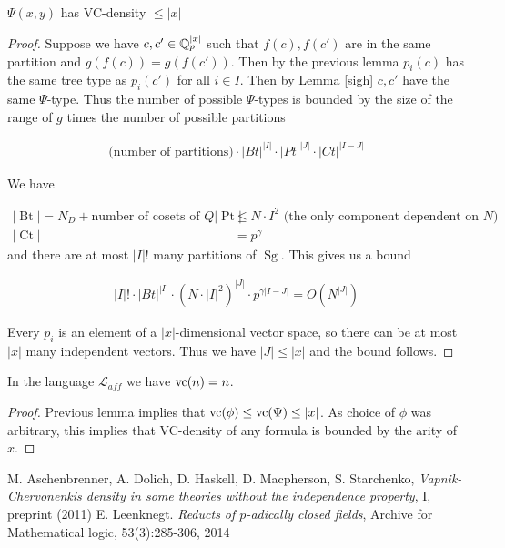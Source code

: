 \documentclass{amsart}
\newcommand{\LLA}{\mathcal L_{aff}}
\DeclareMathOperator{\Sg}{Sg}
\DeclareMathOperator{\Bt}{Bt}
\DeclareMathOperator{\Pt}{Pt}
\DeclareMathOperator{\Ct}{Ct}
\begin{document}
\begin{Corollary}
  $\Psi(x,y)$ has VC-density $\leq |x|$
\end{Corollary}

\begin{proof}
  Suppose we have $c, c' \in \mathbb{Q}_p^{|x|}$ such that $f(c), f(c')$ are in the same partition and $g(f(c)) = g(f(c'))$.
  Then by the previous lemma $p_i(c)$ has the same tree type as $p_i(c')$ for all $i\in I$.
  Then by Lemma \ref{sigh} $c, c'$ have the same $\Psi$-type.
  Thus the number of possible $\Psi$-types is bounded by the size of the range of $g$ times the number of possible partitions
  
  \begin{align*}
    \text{(number of partitions)} \cdot |Bt|^{|I|} \cdot |Pt|^{|J|} \cdot |Ct|^{|I-J|}
  \end{align*}
  
  We have
  
  \begin{align*}
    |\Bt| = N_D + \text {number of cosets of $Q$}
    |\Pt| &\leq N \cdot I^2 \text { (the only component dependent on $N$)} \\
    |\Ct| &= p^\gamma 
  \end{align*}
  and there are at most ${|I|}!$ many partitions of $\Sg$. 
  This gives us a bound
  
  \begin{align*}
    {|I|}! \cdot |Bt|^{|I|} \cdot (N \cdot {|I|}^2)^{|J|} \cdot p^{\gamma {|I-J|}} = O(N^{|J|})
  \end{align*}	
  
  Every $p_i$ is an element of a $|x|$-dimensional vector space, so there can be at most $|x|$ many independent vectors.
  Thus we have $|J| \leq |x|$ and the bound follows.
\end{proof}

\begin{Corollary}
  In the language $\LLA$ we have $\operatorname{vc}(n) = n$.
\end{Corollary}

\begin{proof}
  Previous lemma implies that $\operatorname{vc}(\phi) \leq \operatorname{vc}(\Psi) \leq |x|$.
  As choice of $\phi$ was arbitrary, this implies that VC-density of any formula is bounded by the arity of $x$.
\end{proof}

\begin{thebibliography}{9}
  M. Aschenbrenner, A. Dolich, D. Haskell, D. Macpherson, S. Starchenko,
  \textit{Vapnik-Chervonenkis density in some theories without the independence property}, I, preprint (2011)
  E. Leenknegt. \textit{Reducts of $p$-adically closed fields}, Archive for Mathematical logic, 53(3):285-306, 2014
\end{thebibliography}
\end{document}
